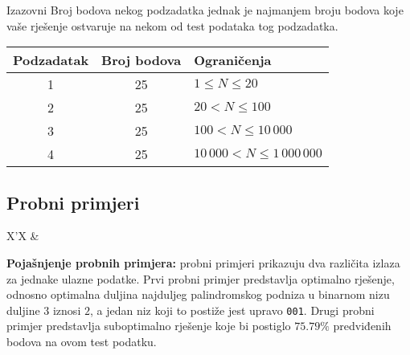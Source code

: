 \begin{statement}[
  problempoints=100,
  timelimit=1 sekunda,
  memorylimit=512 MiB,
]{Izazovni}
Broj bodova nekog podzadatka jednak je najmanjem broju bodova koje vaše rješenje
ostvaruje na nekom od test podataka tog podzadatka.

{\renewcommand{\arraystretch}{1.4}
  \setlength{\tabcolsep}{6pt}
  \begin{tabular}{ccl}
 Podzadatak & Broj bodova & Ograničenja \\ \midrule
  1 & 25 & $1 \le N \le 20$ \\
  2 & 25 & $20 < N \le 100$ \\
  3 & 25 & $100 < N \le 10\,000$ \\
  4 & 25 & $10\,000 < N \le 1\,000\,000$ \\
\end{tabular}}

\subsection*{Probni primjeri}
\begin{tabularx}{\textwidth}{X'X}
 &
\end{tabularx}

\textbf{Pojašnjenje probnih primjera:} probni primjeri prikazuju dva
različita izlaza za jednake ulazne podatke. Prvi probni primjer predstavlja
optimalno rješenje, odnosno optimalna duljina najduljeg palindromskog podniza
u binarnom nizu duljine $3$ iznosi $2$, a jedan niz koji to postiže jest upravo
\texttt{001}. Drugi probni primjer predstavlja suboptimalno rješenje koje
bi postiglo $75.79\%$ predviđenih bodova na ovom test podatku.

\end{statement}


